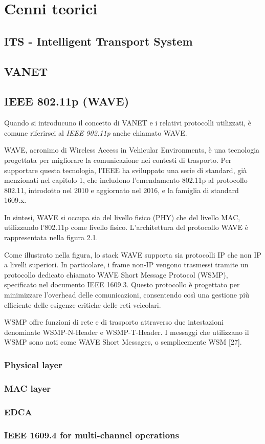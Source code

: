 \chapter{Cenni teorici}

\section{ITS - Intelligent Transport System}

\section{VANET}

\section{IEEE 802.11p (WAVE)}
Quando si introducuno il concetto di VANET e i relativi protocolli utilizzati, è comune riferirsci al \textit{IEEE 902.11p} anche chiamato WAVE.

WAVE, acronimo di Wireless Access in Vehicular Environments, è una tecnologia progettata per migliorare la comunicazione nei contesti di trasporto. Per supportare questa tecnologia, l'IEEE ha sviluppato una serie di standard, già menzionati nel capitolo 1, che includono l'emendamento 802.11p al protocollo 802.11, introdotto nel 2010 e aggiornato nel 2016, e la famiglia di standard 1609.x.

In sintesi, WAVE si occupa sia del livello fisico (PHY) che del livello MAC, utilizzando l'802.11p come livello fisico. L'architettura del protocollo WAVE è rappresentata nella figura 2.1.

Come illustrato nella figura, lo stack WAVE supporta sia protocolli IP che non IP a livelli superiori. In particolare, i frame non-IP vengono trasmessi tramite un protocollo dedicato chiamato WAVE Short Message Protocol (WSMP), specificato nel documento IEEE 1609.3. Questo protocollo è progettato per minimizzare l'overhead delle comunicazioni, consentendo così una gestione più efficiente delle esigenze critiche delle reti veicolari.

WSMP offre funzioni di rete e di trasporto attraverso due intestazioni denominate WSMP-N-Header e WSMP-T-Header. I messaggi che utilizzano il WSMP sono noti come WAVE Short Messages, o semplicemente WSM [27].


\subsection[Physical layer]{Physical layer}

\subsection[MAC layer]{MAC layer}

\subsection[EDCA]{EDCA}

\subsection[IEEE 1609.4 for multi-channel operations]{IEEE 1609.4 for multi-channel operations}
